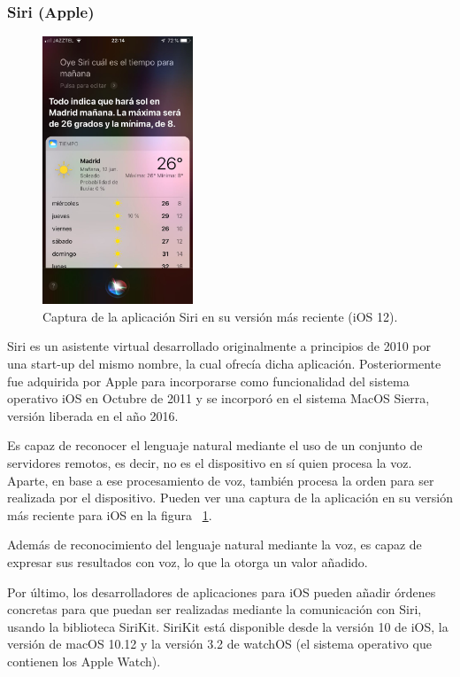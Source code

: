 \documentclass[spanish,12pt, a4paper, twoside]{paper}
\begin{document}
\subsubsection{Siri (Apple)}

\begin{figure}
\centering
	\includegraphics[width=0.4\textwidth]{recursos/siri}
\caption{Captura de la aplicación Siri en su versión más reciente (iOS 12).}
\label{fig:Siri}
\end{figure}

Siri es un asistente virtual desarrollado originalmente a principios de 2010 por una start-up del mismo nombre, la cual ofrecía dicha aplicación. Posteriormente fue adquirida por Apple para incorporarse como funcionalidad del sistema operativo iOS en Octubre de 2011 y se incorporó en el sistema MacOS Sierra, versión liberada en el año 2016.
\newline

Es capaz de reconocer el lenguaje natural mediante el uso de un conjunto de servidores remotos, es decir, no es el dispositivo en sí quien procesa la voz. Aparte, en base a ese procesamiento de voz, también procesa la orden para ser realizada por el dispositivo. Pueden ver una captura de la aplicación en su versión más reciente para iOS en la figura ~\ref{fig:Siri}.
\newline

Además de reconocimiento del lenguaje natural mediante la voz, es capaz de expresar sus resultados con voz, lo que la otorga un valor añadido.
\newline

Por último, los desarrolladores de aplicaciones para iOS pueden añadir órdenes concretas para que puedan ser realizadas mediante la comunicación con Siri, usando la biblioteca SiriKit. SiriKit está disponible desde la versión 10 de iOS, la versión de macOS 10.12 y la versión 3.2 de watchOS (el sistema operativo que contienen los Apple Watch).
\end{document}
